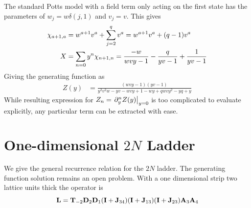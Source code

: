 The standard Potts model with a field term only acting on the first state has the parameters of $w_j=w \delta(j,1)$ and $v_j=v$. This gives
\begin{align}
\chi_{a+1, a} 	&= w^{a+1}v^a + \sum_{j=2}^{q} v^a  
					 = w^{a+1}v^a + (q-1)v^a \\
X &= \sum_{n=0} y^n \chi_{n+1, n} 
   = {\frac{-w}{w v y-1}}-{\frac {q}{y v-1}}+ \frac{1}{y v-1}
\end{align}
Giving the generating function as
\begin{align}
Z(y) &=  {\frac { ( wvy-1 )  ( yv-1 ) }{{y}^{2}{v}^{2}w-y
v-w v y+1-w y+q w v{y}^{2}-y q+y}}
\end{align}
While resulting expression for $Z_n = \left.  \partial_y^n Z(y)  \right \vert _ {y=0} $ is too complicated to evaluate explicitly, any particular term can be extracted with ease. 

\section{One-dimensional \texorpdfstring{$2N$}{2N}  Ladder }
\label{sec:two_d_ladder}

\begin{center}
\TIKZgraphtwoline
\end{center}

We give the general recurrence relation for the $2N$ ladder. The generating function solution remains an open problem. With a one dimensional strip two lattice units thick the operator is
\begin{equation}
{\bf L} = 
{\bf T}_{-2} {\bf D}_2 {\bf D}_1 
({\bf I} + {\bf J}_{34}) 
({\bf I} + {\bf J}_{13}) 
({\bf I} + {\bf J}_{23}) 
{\bf A}_{3} {\bf A}_{4}
\end{equation}

